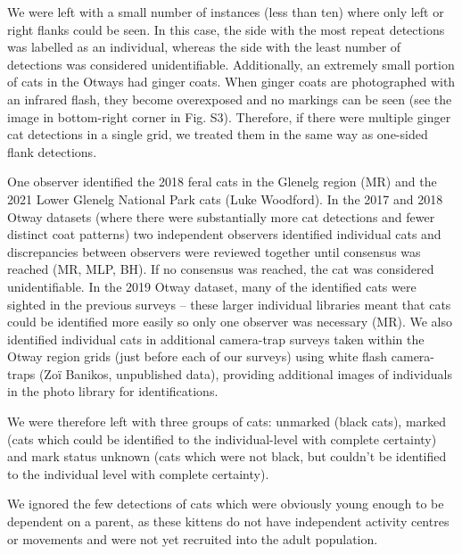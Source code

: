 \documentclass[11pt,a4paper,titlepage,twoside,openright]{style/unimelbthesis}
\begin{document}
\begin{mainmatter}
We were left with a small number of instances (less than ten) where only left or right flanks could be seen. In this case, the side with the most repeat detections was labelled as an individual, whereas the side with the least number of detections was considered unidentifiable. Additionally, an extremely small portion of cats in the Otways had ginger coats. When ginger coats are photographed with an infrared flash, they become overexposed and no markings can be seen (see the image in bottom-right corner in Fig. S3). Therefore, if there were multiple ginger cat detections in a single grid, we treated them in the same way as one-sided flank detections.

One observer identified the 2018 feral cats in the Glenelg region (MR) and the 2021 Lower Glenelg National Park cats (Luke Woodford). In the 2017 and 2018 Otway datasets (where there were substantially more cat detections and fewer distinct coat patterns) two independent observers identified individual cats and discrepancies between observers were reviewed together until consensus was reached (MR, MLP, BH). If no consensus was reached, the cat was considered unidentifiable. In the 2019 Otway dataset, many of the identified cats were sighted in the previous surveys -- these larger individual libraries meant that cats could be identified more easily so only one observer was necessary (MR). We also identified individual cats in additional camera-trap surveys taken within the Otway region grids (just before each of our surveys) using white flash camera-traps (Zoï Banikos, unpublished data), providing additional images of individuals in the photo library for identifications.

We were therefore left with three groups of cats: unmarked (black cats), marked (cats which could be identified to the individual-level with complete certainty) and mark status unknown (cats which were not black, but couldn't be identified to the individual level with complete certainty).

We ignored the few detections of cats which were obviously young enough to be dependent on a parent, as these kittens do not have independent activity centres or movements and were not yet recruited into the adult population.

\newpage

\(~\)

\(~\)

\(~\)
\begin{figure}


\end{figure}
\end{mainmatter}
\end{document}
